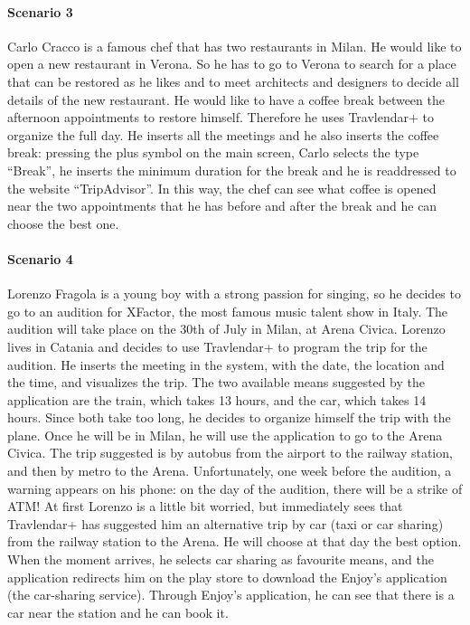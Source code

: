 \documentclass[12pt,titlepage]{article}
\begin{document}
\paragraph{Scenario 3}
Carlo Cracco is a famous chef that has two restaurants in Milan. He would like to open a new restaurant in Verona. So he has to go to Verona to search for a place that can be restored as he likes and to meet architects and designers to decide all details of the new restaurant. He would like to have a coffee break between the afternoon appointments to restore himself. Therefore he uses Travlendar+ to organize the full day. He inserts all the meetings and he also inserts the coffee break: pressing the plus symbol on the main screen, Carlo selects the type ``Break'', he inserts the minimum duration for the break and he is readdressed to the website ``TripAdvisor''. In this way, the chef can see what coffee is opened near the two appointments that he has before and after the break and he can choose the best one.

\paragraph{Scenario 4}
Lorenzo Fragola is a young boy with a strong passion for singing, so he decides to go to an audition for XFactor, the most famous music talent show in Italy. The audition will take place on the 30th of July in Milan, at Arena Civica. Lorenzo lives in Catania and decides to use Travlendar+ to program the trip for the audition. He inserts the meeting in the system, with the date, the location and the time, and visualizes the trip. The two available means suggested by the application are the train, which takes 13 hours, and the car, which takes 14 hours. Since both take too long, he decides to organize himself the trip with the plane. Once he will be in Milan, he will use the application to go to the Arena Civica. The trip suggested is by autobus from the airport to the railway station, and then by metro to the Arena. Unfortunately, one week before the audition, a warning appears on his phone: on the day of the audition, there will be a strike of ATM! At first Lorenzo is a little bit worried, but immediately sees that Travlendar+ has suggested him an alternative trip by car (taxi or car sharing) from the railway station to the Arena. He will choose at that day the best option. When the moment arrives, he selects car sharing as favourite means, and the application redirects him on the play store to download the Enjoy's application (the car-sharing service). Through Enjoy's application, he can see that there is a car near the station and he can book it.
\end{document}
